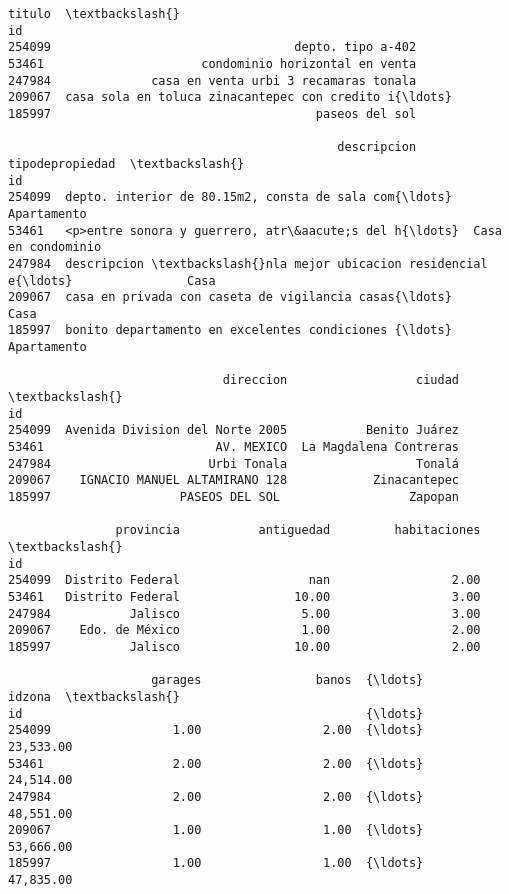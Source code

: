 \documentclass[11pt]{article}
\newcommand{\prompt}[4]{
        \llap{{\color{#2}[#3]: #4}}\vspace{-1.25em}
    }
\begin{document}
            \begin{tcolorbox}[breakable, boxrule=.5pt, size=fbox, pad at break*=1mm, opacityfill=0]
\prompt{Out}{outcolor}{22}{\hspace{3.5pt}}
\begin{Verbatim}[commandchars=\\\{\}]
                                                   titulo  \textbackslash{}
id
254099                                  depto. tipo a-402
53461                      condominio horizontal en venta
247984              casa en venta urbi 3 recamaras tonala
209067  casa sola en toluca zinacantepec con credito i{\ldots}
185997                                     paseos del sol

                                              descripcion     tipodepropiedad  \textbackslash{}
id
254099  depto. interior de 80.15m2, consta de sala com{\ldots}         Apartamento
53461   <p>entre sonora y guerrero, atr\&aacute;s del h{\ldots}  Casa en condominio
247984  descripcion \textbackslash{}nla mejor ubicacion residencial e{\ldots}                Casa
209067  casa en privada con caseta de vigilancia casas{\ldots}                Casa
185997  bonito departamento en excelentes condiciones {\ldots}         Apartamento

                              direccion                  ciudad  \textbackslash{}
id
254099  Avenida Division del Norte 2005           Benito Juárez
53461                        AV. MEXICO  La Magdalena Contreras
247984                      Urbi Tonala                  Tonalá
209067    IGNACIO MANUEL ALTAMIRANO 128            Zinacantepec
185997                  PASEOS DEL SOL                  Zapopan

               provincia           antiguedad         habitaciones  \textbackslash{}
id
254099  Distrito Federal                  nan                 2.00
53461   Distrito Federal                10.00                 3.00
247984           Jalisco                 5.00                 3.00
209067    Edo. de México                 1.00                 2.00
185997           Jalisco                10.00                 2.00

                    garages                banos  {\ldots}               idzona  \textbackslash{}
id                                                {\ldots}
254099                 1.00                 2.00  {\ldots}            23,533.00
53461                  2.00                 2.00  {\ldots}            24,514.00
247984                 2.00                 2.00  {\ldots}            48,551.00
209067                 1.00                 1.00  {\ldots}            53,666.00
185997                 1.00                 1.00  {\ldots}            47,835.00


\end{Verbatim}
\end{tcolorbox}
\end{document}
